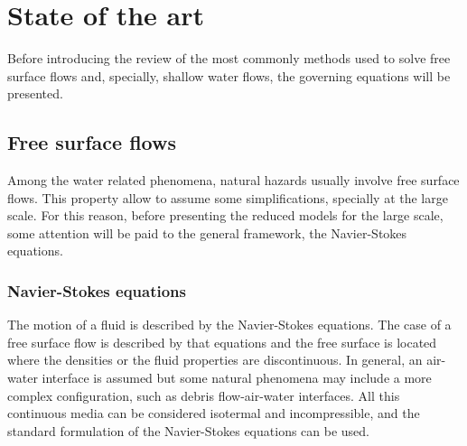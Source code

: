 
\chapter{State of the art}
\label{equations}


Before introducing the review of the most commonly methods used to solve free surface flows and, specially, shallow water flows, the governing equations will be presented.



\section{Free surface flows}


Among the water related phenomena, natural hazards usually involve free surface flows. This property allow to assume some simplifications, specially at the large scale. For this reason, before presenting the reduced models for the large scale, some attention will be paid to the general framework, the Navier-Stokes equations.



\subsection{Navier-Stokes equations}


The motion of a fluid is described by the Navier-Stokes equations. The case of a free surface flow is described by that equations and the free surface is located where the densities or the fluid properties are discontinuous. In general, an air-water interface is assumed but some natural phenomena may include a more complex configuration, such as debris flow-air-water interfaces. All this continuous media can be considered isotermal and incompressible, and the standard formulation of the Navier-Stokes equations can be used.

